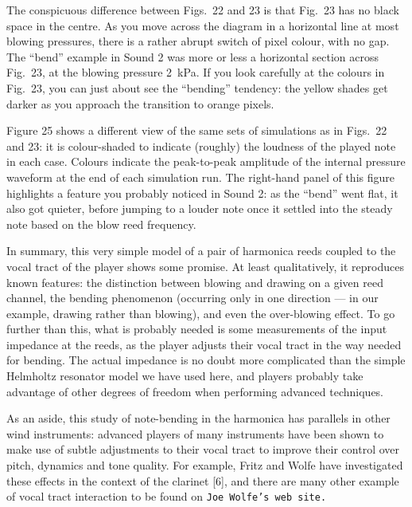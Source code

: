   The conspicuous difference between Figs.\ 22 and 23 is that Fig.\ 23 has no 
  black space in the centre. As you move across the diagram in a horizontal 
  line at most blowing pressures, there is a rather abrupt switch of pixel 
  colour, with no gap. The “bend” example in Sound 2 was more or less a 
  horizontal section across Fig.\ 23, at the blowing pressure 2~kPa. If you 
  look carefully at the colours in Fig.\ 23, you can just about see the 
  “bending” tendency: the yellow shades get darker as you approach the 
  transition to orange pixels. 

  Figure 25 shows a different view of the same sets of simulations as in Figs.\ 
  22 and 23: it is colour-shaded to indicate (roughly) the loudness of the 
  played note in each case. Colours indicate the peak-to-peak amplitude of the 
  internal pressure waveform at the end of each simulation run. The right-hand 
  panel of this figure highlights a feature you probably noticed in Sound 2: as 
  the “bend” went flat, it also got quieter, before jumping to a louder note 
  once it settled into the steady note based on the blow reed frequency. 

  In summary, this very simple model of a pair of harmonica reeds coupled to 
  the vocal tract of the player shows some promise. At least qualitatively, it 
  reproduces known features: the distinction between blowing and drawing on a 
  given reed channel, the bending phenomenon (occurring only in one direction — 
  in our example, drawing rather than blowing), and even the over-blowing 
  effect. To go further than this, what is probably needed is some measurements 
  of the input impedance at the reeds, as the player adjusts their vocal tract 
  in the way needed for bending. The actual impedance is no doubt more 
  complicated than the simple Helmholtz resonator model we have used here, and 
  players probably take advantage of other degrees of freedom when performing 
  advanced techniques. 

  As an aside, this study of note-bending in the harmonica has parallels in 
  other wind instruments: advanced players of many instruments have been shown 
  to make use of subtle adjustments to their vocal tract to improve their 
  control over pitch, dynamics and tone quality. For example, Fritz and Wolfe 
  have investigated these effects in the context of the clarinet [6], and there 
  are many other example of vocal tract interaction to be found on \tt{}Joe 
  Wolfe’s web site\rm{}. 



